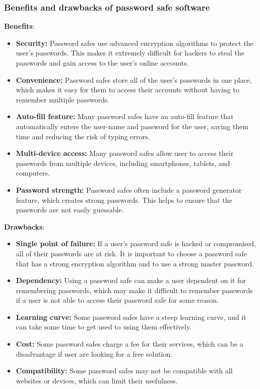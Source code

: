 \documentclass[conference]{IEEEtran}
\begin{document}
\subsubsection{Benefits and drawbacks of password safe software}\cite{b8}
\textbf{Benefits}:
\begin{itemize}
\item \textbf{Security:} Password safes use advanced encryption algorithms to protect the user's passwords. This makes it extremely difficult for hackers to steal the passwords and gain access to the user's online accounts.
\item \textbf{Convenience:} Password safes store all of the user's passwords in one place, which makes it easy for them to access their accounts without having to remember multiple passwords.
\item \textbf{Auto-fill feature:} Many password safes have an auto-fill feature that automatically enters the user-name and password for the user, saving them time and reducing the risk of typing errors.
\item \textbf{Multi-device access:} Many password safes allow user to access their passwords from multiple devices, including smartphones, tablets, and computers.
\item \textbf{Password strength:} Password safes often include a password generator feature, which creates strong passwords. This helps to ensure that the passwords are not easily guessable.
\end{itemize}
\textbf{Drawbacks}:
\begin{itemize}
\item \textbf{Single point of failure:} If a user's password safe is hacked or compromised, all of their passwords are at risk. It is important to choose a password safe that has a strong encryption algorithm and to use a strong master password.
\item \textbf{Dependency:} Using a password safe can make a user dependent on it for remembering passwords, which may make it difficult to remember passwords if a user is not able to access their password safe for some reason.
\item \textbf{Learning curve:} Some password safes have a steep learning curve, and it can take some time to get used to using them effectively.
\item \textbf{Cost:} Some password safes charge a fee for their services, which can be a disadvantage if user are looking for a free solution.
\item \textbf{Compatibility:} Some password safes may not be compatible with all websites or devices, which can limit their usefulness.
\end{itemize}
\end{document}
